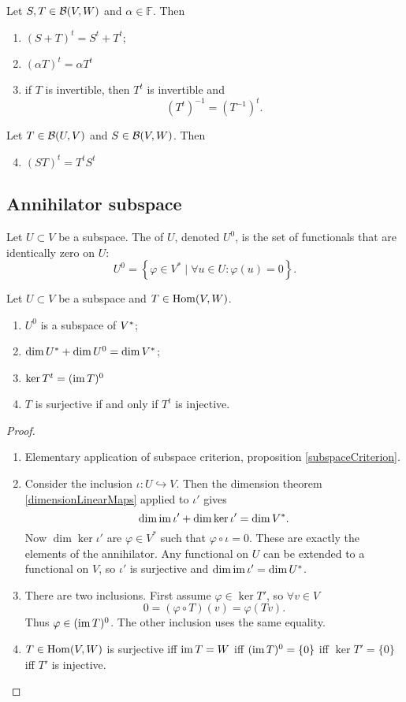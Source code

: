 \begin{lemma}
Let $S,T\in\operatorname{\mathcal{B}}(V,W)$ and $\alpha\in\mathbb{F}$. Then
\begin{enumerate}
\item $(S+T)^t = S^t+T^t$;
\item $(\alpha T)^t = \alpha T^t$
\item if $T$ is invertible, then $T^t$ is invertible and
\[ (T^t)^{-1} = (T^{-1})^t. \]
\end{enumerate}
Let $T\in\operatorname{\mathcal{B}}(U,V)$ and $S\in\operatorname{\mathcal{B}}(V,W)$. Then
\begin{enumerate}
\setcounter{enumi}{3}
\item $(ST)^t = T^tS^t$
\end{enumerate}
\end{lemma}


\subsection{Annihilator subspace}
\begin{definition}
Let $U\subset V$ be a subspace. The  of $U$, denoted $U^0$, is the set of functionals that are identically zero on $U$:
\[ U^0 = \left\{ \varphi\in V^*\;|\; \forall u\in U:\varphi(u) = 0 \right\}. \]
\end{definition}
\begin{proposition} \label{annihilatorSpace}
Let $U\subset V$ be a subspace and $T\in \operatorname{Hom}(V,W)$.
\begin{enumerate}
\item $U^0$ is a subspace of ${V}^*$;
\item $\dim {U}^* + \dim U^0 = \dim {V}^*$;
\item $\ker T^t = (\operatorname{im} T)^0$
\item $T$ is surjective \textup{if and only if} $T^t$ is injective.
\end{enumerate}
\end{proposition}
\begin{proof}
\mbox{}
\begin{enumerate}
\item Elementary application of subspace criterion, proposition \ref{subspaceCriterion}.
\item Consider the inclusion $\iota: U\hookrightarrow V$. Then the dimension theorem \ref{dimensionLinearMaps} applied to $\iota'$ gives
\[ \dim \operatorname{im} \iota' + \dim \ker\iota' = \dim V^*. \]
Now $\dim \ker\iota'$ are $\varphi\in V^*$ such that $\varphi \circ \iota = 0$. These are exactly the elements of the annihilator. Any functional on $U$ can be extended to a functional on $V$, so $\iota'$ is surjective and $\dim \operatorname{im} \iota' = \dim U^*$.
\item There are two inclusions. First assume $\varphi \in \ker T'$, so $\forall v\in V$
\[ 0 = (\varphi\circ T)(v) = \varphi(Tv). \]
Thus $\varphi\in(\operatorname{im} T)^0$. The other inclusion uses the same equality.
\item $T\in\operatorname{Hom}(V,W)$ is surjective iff $\operatorname{im} T = W$ iff $(\operatorname{im} T)^0 = \{0\}$ iff $\ker T' = \{0\}$ iff $T'$ is injective.
\end{enumerate}
\end{proof}



